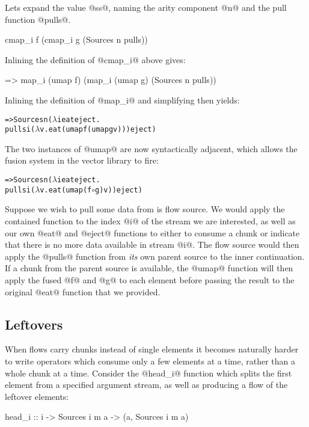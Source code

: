 Lets expand the value @ss@, naming the arity component @n@ and the pull function @pulls@.
\begin{code}
   cmap_i f (cmap_i g (Sources n pulls))
\end{code}

Inlining the definition of @cmap_i@ above gives:
\begin{code}
=> map_i (umap f) (map_i (umap g) (Sources n pulls))
\end{code}

Inlining the definition of @map_i@ and simplifying then yields:
\begin{alltt}
=> Sources n (\(\lambda\)i eat eject.
     pulls i (\(\lambda\)v. eat (umap f (umap g v))) eject)
\end{alltt}
The two instances of @umap@ are now syntactically adjacent, which allows the fusion system in the vector library to fire:

\begin{alltt}
=> Sources n (\(\lambda\)i eat eject.
     pulls i (\(\lambda\)v. eat (umap (f \(\circ\) g) v)) eject)
\end{alltt}

Suppose we wish to pull some data from is flow source. We would apply the contained function to the index @i@ of the stream we are interested, as well as our own @eat@ and @eject@ functions to either to consume a chunk or indicate that there is no more data available in stream @i@. The flow source would then apply the @pulls@ function from \emph{its} own parent source to the inner continuation. If a chunk from the parent source is available, the @umap@ function will then apply the fused @f@ and @g@ to each element before passing the result to the original @eat@ function that we provided.


\subsection{Leftovers}
When flows carry chunks instead of single elements it becomes naturally harder to write operators which consume only a few elements at a time, rather than a whole chunk at a time. Consider the @head_i@ function which splits the first element from a specified argument stream, as well as producing a flow of the leftover elements:
\begin{code}
 head_i :: i -> Sources i m a -> (a, Sources i m a)
\end{code}

